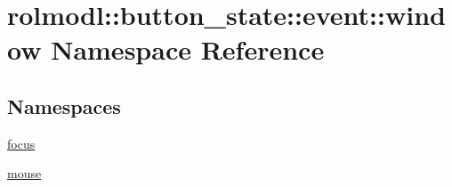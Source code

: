 \hypertarget{namespacerolmodl_1_1button__state_1_1event_1_1window}{}\section{rolmodl\+::button\+\_\+state\+::event\+::window Namespace Reference}
\label{namespacerolmodl_1_1button__state_1_1event_1_1window}
\subsection*{Namespaces}
\begin{DoxyCompactItemize}
\item 
 \mbox{\hyperlink{namespacerolmodl_1_1button__state_1_1event_1_1window_1_1focus}{focus}}
\item 
 \mbox{\hyperlink{namespacerolmodl_1_1button__state_1_1event_1_1window_1_1mouse}{mouse}}
\end{DoxyCompactItemize}
